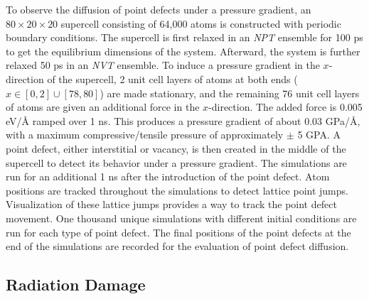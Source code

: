 \documentclass[review]{elsarticle}
\begin{document}
To observe the diffusion of point defects under a pressure gradient, an $80 \times 20 \times 20$ supercell consisting of 64,000 atoms is constructed with periodic boundary conditions. The supercell is first relaxed in an \textit{NPT} ensemble for 100 ps to get the equilibrium dimensions of the system. Afterward, the system is further relaxed 50 ps in an \textit{NVT} ensemble. To induce a pressure gradient in the $x$-direction of the supercell, 2 unit cell layers of atoms at both ends ($x \in [0, 2] \cup [78, 80]$) are made stationary, and the remaining 76 unit cell layers of atoms are given an additional force in the $x$-direction. The added force is 0.005 eV/\r{A} ramped over 1 ns. This produces a pressure gradient of about 0.03 GPa/\r{A}, with a maximum compressive/tensile pressure of approximately $\pm$ 5 GPA. A point defect, either interstitial or vacancy, is then created in the middle of the supercell to detect its behavior under a pressure gradient. The simulations are run for an additional 1 ns after the introduction of the point defect. Atom positions are tracked throughout the simulations to detect lattice point jumps. Visualization of these lattice jumps provides a way to track the point defect movement. One thousand unique simulations with different initial conditions are run for each type of point defect. The final positions of the point defects at the end of the simulations are recorded for the evaluation of point defect diffusion.

\subsection{Radiation Damage}
\end{document}
